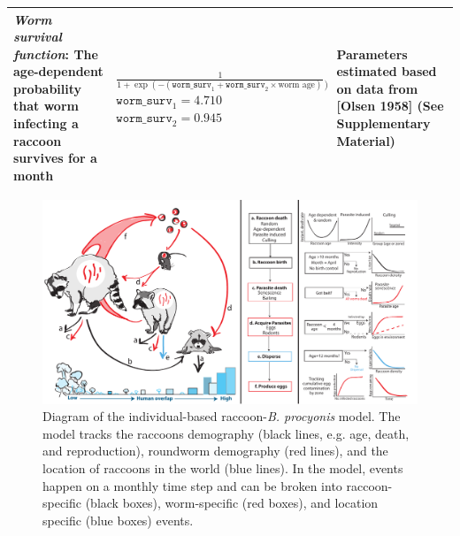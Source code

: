 \documentclass[11pt]{article}
\begin{document}
\begin{longtable}{p{4.5cm} p{4.5cm} p{5cm}}
\hline
\emph{Worm survival function}: The age-dependent probability that worm infecting a raccoon survives for a month & $\frac{1}{1 + \exp(-(\texttt{worm\_surv}_1 + \texttt{worm\_surv}_2\times \text{worm age}))}$ \newline\newline $\texttt{worm\_surv}_1 = 4.710$ \newline $\texttt{worm\_surv}_2 = 0.945$  & Parameters estimated based on data from [Olsen 1958] (See Supplementary Material)  \\
\bottomrule
\end{longtable}

\clearpage

\begin{figure}
    \includegraphics[width=\textwidth]{images/lifecycle_model_diagram.pdf}
    \caption{Diagram of the individual-based raccoon-\emph{B. procyonis} model.  The model tracks the raccoons demography (black lines, e.g. age, death, and reproduction), roundworm demography (red lines), and the location of raccoons in the world (blue lines).  In the model, events happen on a monthly time step and can be broken into raccoon-specific (black boxes), worm-specific (red boxes), and location specific (blue boxes) events.}
    \label{fig:mod_diagram}
\end{figure}
\end{document}
